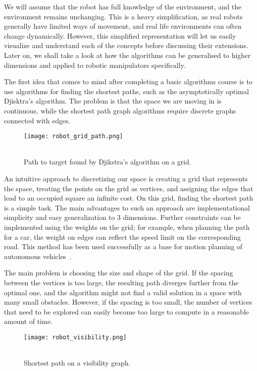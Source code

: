 We will assume that the robot has full knowledge of the environment, and the environment remains unchanging. This is a heavy simplification, as real robots generally have limited ways of movement, and real life environments can often change dynamically. However, this simplified representation will let us easily visualize and understand each of the concepts before discussing their extensions. Later on, we shall take a look at how the algorithms can be generalised to higher dimensions and applied to robotic manipulators specifically.

The first idea that comes to mind after completing a basic algorithms course is to use algorithms for finding the shortest paths, such as the asymptotically optimal Djisktra's algorithm. The problem is that the space we are moving in is continuous, while the shortest path graph algorithms require discrete graphs connected with edges.

\begin{wrapfigure}{r}{0.33\textwidth}
    \centering
    \texttt{[image: robot\_grid\_path.png]}
  \caption{\\Path to target found by Djikstra's algorithm on a grid.}\label{fig:grid}
\end{wrapfigure}

An intuitive approach to discretizing our space is creating a grid that represents the space, treating the points on the grid as vertices, and assigning the edges that lead to an occupied square an infinite cost. On this grid, finding the shortest path is a simple task. The main advantages to such an approach are implementational simplicity and easy generalization to 3 dimensions. Further constraints can be implemented using the weights on the grid; for example, when planning the path for a car, the weight on edges can reflect the speed limit on the corresponding road.
This method has been used successfully as a base for motion planning of autonomous vehicles~\cite{grid1, grid2}.

The main problem is choosing the size and shape of the grid. If the spacing between the vertices is too large, the resulting path diverges further from the optimal one, and the algorithm might not find a valid solution in a space with many small obstacles. However, if the spacing is too small, the number of vertices that need to be explored can easily become too large to compute in a reasonable amount of time.


\begin{wrapfigure}{r}{0.33\textwidth}
    \centering
    \texttt{[image: robot\_visibility.png]}
  \caption{\\Shortest path on a visibility graph.}\label{fig:vis}
\end{wrapfigure}


